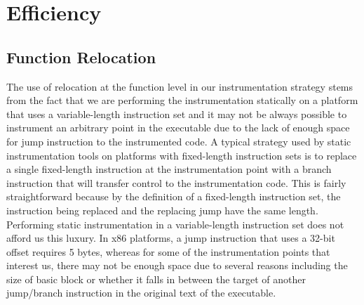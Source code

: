 \section{Efficiency}

\subsection{Function Relocation}
The use of relocation at the function level in our instrumentation strategy stems from the fact
that we are performing the instrumentation statically on a platform that uses a
variable-length instruction set and it may not be always possible to instrument
an arbitrary point in the executable due to the lack of enough space for jump instruction to the instrumented code. 
A typical strategy used by static
instrumentation tools on platforms with fixed-length instruction sets is to
replace a single fixed-length instruction at the instrumentation point with a
branch instruction that will transfer control to the instrumentation code. This is fairly straightforward because by the
definition of a fixed-length instruction set, the instruction being replaced and
the replacing jump have the same length. Performing static instrumentation
in a variable-length instruction set does not afford us this luxury. In x86 platforms, a
jump instruction that uses a 32-bit offset requires 5 bytes, whereas for some of
the instrumentation points that interest us, there may not be enough space due
to several reasons including the size of basic block or whether it falls in between the target
of another jump/branch instruction in the original text of the executable.

